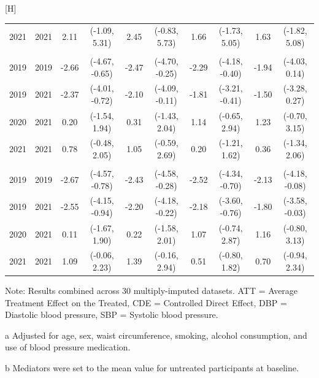 \documentclass[
  letterpaper,
  DIV=11,
  numbers=noendperiod]{scrartcl}
\makeatletter
\renewenvironment{table}%
  {\renewcommand\familydefault\sfdefault
   \@float{table}}
  {\end@float}
\makeatother
\begin{document}
\begin{table}[H]
\begin{threeparttable}
\begin{tabular}{llcccccccc}
\hspace{1em}2021 & 2021 & 2.11 & (-1.09, 5.31) & 2.45 & (-0.83, 5.73) & 1.66 & (-1.73, 5.05) & 1.63 & (-1.82, 5.08)\\
\addlinespace[0.3em]
\multicolumn{10}{l}{\textbf{Brachial DBP}}\\
\hspace{1em}2019 & 2019 & -2.66 & (-4.67, -0.65) & -2.47 & (-4.70, -0.25) & -2.29 & (-4.18, -0.40) & -1.94 & (-4.03, 0.14)\\
\hspace{1em}2019 & 2021 & -2.37 & (-4.01, -0.72) & -2.10 & (-4.09, -0.11) & -1.81 & (-3.21, -0.41) & -1.50 & (-3.28, 0.27)\\
\hspace{1em}2020 & 2021 & 0.20 & (-1.54, 1.94) & 0.31 & (-1.43, 2.04) & 1.14 & (-0.65, 2.94) & 1.23 & (-0.70, 3.15)\\
\hspace{1em}2021 & 2021 & 0.78 & (-0.48, 2.05) & 1.05 & (-0.59, 2.69) & 0.20 & (-1.21, 1.62) & 0.36 & (-1.34, 2.06)\\
\addlinespace[0.3em]
\multicolumn{10}{l}{\textbf{Central DBP}}\\
\hspace{1em}2019 & 2019 & -2.67 & (-4.57, -0.78) & -2.43 & (-4.58, -0.28) & -2.52 & (-4.34, -0.70) & -2.13 & (-4.18, -0.08)\\
\hspace{1em}2019 & 2021 & -2.55 & (-4.15, -0.94) & -2.20 & (-4.18, -0.22) & -2.18 & (-3.60, -0.76) & -1.80 & (-3.58, -0.03)\\
\hspace{1em}2020 & 2021 & 0.11 & (-1.67, 1.90) & 0.22 & (-1.58, 2.01) & 1.07 & (-0.74, 2.87) & 1.16 & (-0.80, 3.13)\\
\hspace{1em}2021 & 2021 & 1.09 & (-0.06, 2.23) & 1.39 & (-0.16, 2.94) & 0.51 & (-0.80, 1.82) & 0.70 & (-0.94, 2.34)\\
\bottomrule
\end{tabular}
\begin{tablenotes}
\item \small{Note: Results combined across 30 multiply-imputed datasets. ATT = Average Treatment Effect on the Treated, CDE = Controlled Direct Effect, DBP = Diastolic blood pressure, SBP = Systolic blood pressure.}
\item[a] \small{Adjusted for age, sex, waist circumference, smoking, alcohol consumption, and use of blood pressure medication.}
\item[b] \small{Mediators were set to the mean value for untreated participants at baseline.}
\end{tablenotes}
\end{threeparttable}
\endgroup{}
\end{table}
\end{document}

